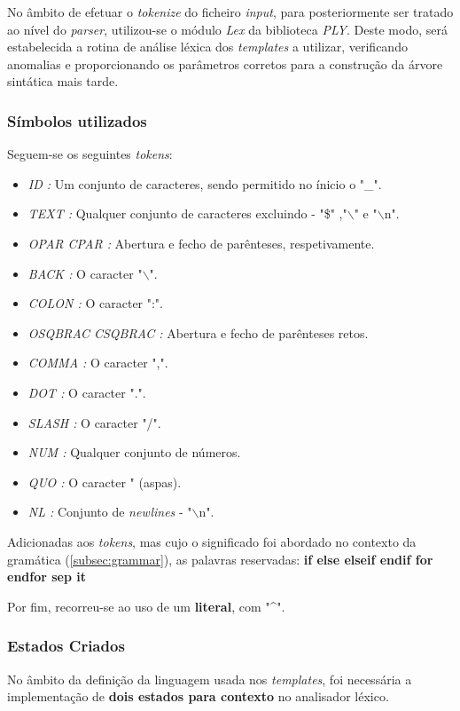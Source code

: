 \documentclass[../relatorio.tex]{subfiles}
\begin{document}
    No âmbito de efetuar o \textit{tokenize} do ficheiro \textit{input},
    para posteriormente ser tratado ao nível do \textit{parser}, 
    utilizou-se o módulo \textit{Lex} da biblioteca \textit{PLY}.
    Deste modo, será estabelecida a rotina de análise léxica 
    dos \textit{templates} a utilizar, verificando anomalias e
    proporcionando os parâmetros corretos para a construção da árvore 
    sintática mais tarde.

    \subsubsection{Símbolos utilizados}

    Seguem-se os seguintes \textit{tokens}:
    \begin{itemize}
        \item \textit{ID :} Um conjunto de caracteres, sendo permitido no ínicio o "\_".
        \item \textit{TEXT :} Qualquer conjunto de caracteres excluindo - "\$" ,"$\backslash$" e "$\backslash$n".
        \item \textit{OPAR CPAR :} Abertura e fecho de parênteses, respetivamente.
        \item \textit{BACK :} O caracter "$\backslash$".
        \item \textit{COLON :} O caracter ":".
        \item \textit{OSQBRAC CSQBRAC :} Abertura e fecho de parênteses retos.
        \item \textit{COMMA :} O caracter ",".
        \item \textit{DOT :} O caracter ".".
        \item \textit{SLASH :} O caracter "/".
        \item \textit{NUM :} Qualquer conjunto de números.
        \item \textit{QUO :} O caracter " (aspas).
        \item \textit{NL :} Conjunto de \textit{newlines} - "$\backslash$n".
    \end{itemize}

    Adicionadas aos \textit{tokens}, mas cujo o significado foi abordado
    no contexto da gramática (\ref{subsec:grammar}), as palavras reservadas:
        \textbf{if else elseif endif for endfor sep it}

    Por fim, recorreu-se ao uso de um \textbf{literal}, com "\^{}".

    \subsubsection{Estados Criados}
    No âmbito da definição da linguagem usada nos \textit{templates},
    foi necessária a implementação de \textbf{dois estados para contexto} no
    analisador léxico.
\end{document}
